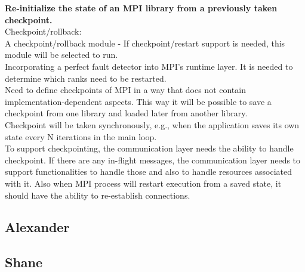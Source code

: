 \documentclass{article}
\begin{document}
\textbf{Re-initialize the state of an MPI library from a previously taken checkpoint.}\\

	Checkpoint/rollback:\\
	
	A checkpoint/rollback module - If checkpoint/restart support is needed, this module will be selected to run.\\
	
	Incorporating a perfect fault detector into MPI's runtime layer. It is needed to determine which ranks need to be restarted.\\
	
	Need to define checkpoints of MPI in a way that does not contain implementation-dependent aspects. This way it will be possible to save a checkpoint from one library and loaded later from another library.\\
	
	Checkpoint will be taken synchronously, e.g., when the application saves its own state every N iterations in the main loop.\\
	
	To support checkpointing, the communication layer needs the ability to handle checkpoint. If there are any in-flight messages, the communication layer needs to support functionalities to handle those and also to handle resources associated with it. Also when MPI process will restart execution from a saved state, it should have the ability to re-establish connections.\\
	
	
	
	


\subsection{Alexander}

\subsection{Shane}
\end{document}
